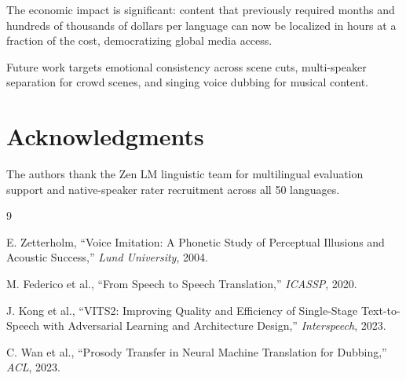 \documentclass[11pt,a4paper]{article}
\begin{document}
The economic impact is significant: content that previously required months and
hundreds of thousands of dollars per language can now be localized in hours at
a fraction of the cost, democratizing global media access.

Future work targets emotional consistency across scene cuts, multi-speaker separation
for crowd scenes, and singing voice dubbing for musical content.

\section*{Acknowledgments}

The authors thank the Zen LM linguistic team for multilingual evaluation support
and native-speaker rater recruitment across all 50 languages.


\begin{thebibliography}{9}

E. Zetterholm,
``Voice Imitation: A Phonetic Study of Perceptual Illusions and Acoustic Success,''
\textit{Lund University}, 2004.

M. Federico et al.,
``From Speech to Speech Translation,''
\textit{ICASSP}, 2020.

J. Kong et al.,
``VITS2: Improving Quality and Efficiency of Single-Stage Text-to-Speech with Adversarial Learning and Architecture Design,''
\textit{Interspeech}, 2023.

C. Wan et al.,
``Prosody Transfer in Neural Machine Translation for Dubbing,''
\textit{ACL}, 2023.

\end{thebibliography}
\end{document}
